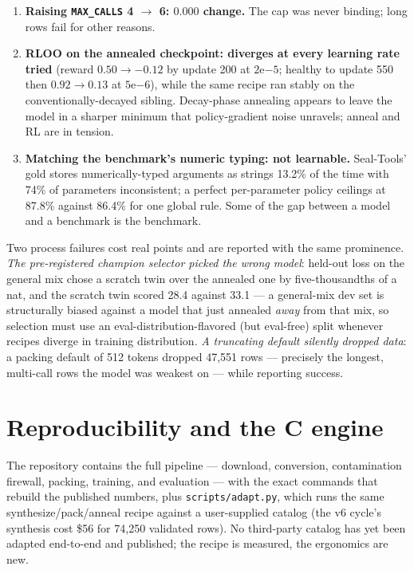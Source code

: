 \documentclass[10pt]{article}
\begin{document}
\begin{enumerate}
Actions) to 33.4\% (Seal-Tools) across sources; a constant that helps one
catalog wrecks another. Inclusion rate is a property of the catalog, which
makes it a training problem, not a decoding constant.
\item \textbf{Raising \texttt{MAX\_CALLS} 4 $\to$ 6: $0.000$ change.} The cap
was never binding; long rows fail for other reasons.
\item \textbf{RLOO \citep{rloo} on the annealed checkpoint: diverges at every
learning rate tried} (reward $0.50\to-0.12$ by update 200 at $2\mathrm{e}{-5}$;
healthy to update 550 then $0.92\to0.13$ at $5\mathrm{e}{-6}$), while the same
recipe ran stably on the conventionally-decayed sibling. Decay-phase annealing
appears to leave the model in a sharper minimum that policy-gradient noise
unravels; anneal and RL are in tension.
\item \textbf{Matching the benchmark's numeric typing: not learnable.}
Seal-Tools' gold stores numerically-typed arguments as strings 13.2\% of the
time with 74\% of parameters inconsistent; a perfect per-parameter policy
ceilings at 87.8\% against 86.4\% for one global rule. Some of the gap between
a model and a benchmark is the benchmark.
\end{enumerate}

Two process failures cost real points and are reported with the same
prominence. \emph{The pre-registered champion selector picked the wrong
model}: held-out loss on the general mix chose a scratch twin over the
annealed one by five-thousandths of a nat, and the scratch twin scored 28.4
against 33.1 --- a general-mix dev set is structurally biased against a model
that just annealed \emph{away} from that mix, so selection must use an
eval-distribution-flavored (but eval-free) split whenever recipes diverge in
training distribution. \emph{A truncating default silently dropped data}: a
packing default of 512 tokens dropped 47{,}551 rows --- precisely the longest,
multi-call rows the model was weakest on --- while reporting success.

\section{Reproducibility and the C engine}
\label{sec:engine}

The repository contains the full pipeline --- download, conversion,
contamination firewall, packing, training, and evaluation --- with the exact
commands that rebuild the published numbers, plus \texttt{scripts/adapt.py},
which runs the same synthesize/pack/anneal recipe against a user-supplied
catalog (the v6 cycle's synthesis cost \$56 for 74{,}250 validated rows). No
third-party catalog has yet been adapted end-to-end and published; the recipe
is measured, the ergonomics are new.
\end{document}
